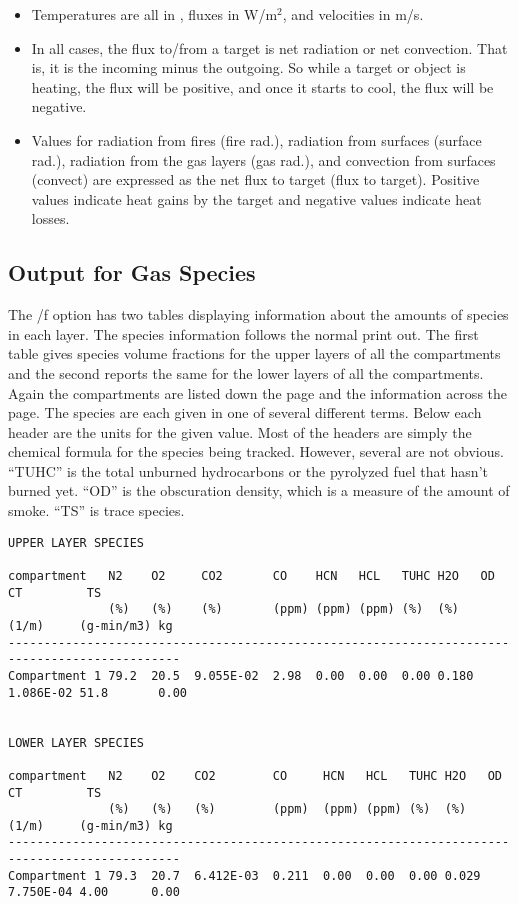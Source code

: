 \begin{itemize}
\item Temperatures are all in \degc, fluxes in W/m$^2$, and velocities in m/s.
\item In all cases, the flux to/from a target is net radiation or net convection. That is, it is the incoming minus the outgoing. So while a target or object is heating, the flux will be positive, and once it starts to cool, the flux will be negative.
\item Values for radiation from fires (fire rad.), radiation from surfaces (surface rad.), radiation from the gas layers (gas rad.), and convection from surfaces (convect) are expressed as the net flux to target (flux to target). Positive values indicate heat gains by the target and negative values indicate heat losses.
\end{itemize}

\subsection{Output for Gas Species}

The /f option has two tables displaying information about the amounts of species in each layer. The species information follows the normal print out.  The first table gives species volume fractions for the upper layers of all the compartments and the second reports the same for the lower layers of all the compartments.  Again the compartments are listed down the page and the information across the page.  The species are each given in one of several different terms.  Below each header are the units for the given value.  Most of the headers are simply the chemical formula for the species being tracked.  However, several are not obvious.  ``TUHC'' is the total unburned hydrocarbons or the pyrolyzed fuel that hasn't burned yet.  ``OD'' is the obscuration density, which is a measure of the amount of smoke. ``TS'' is trace species.

\begin{lstlisting}[basicstyle=\tiny]
UPPER LAYER SPECIES

compartment   N2    O2     CO2       CO    HCN   HCL   TUHC H2O   OD        CT         TS
              (%)   (%)    (%)       (ppm) (ppm) (ppm) (%)  (%)   (1/m)     (g-min/m3) kg
----------------------------------------------------------------------------------------------
Compartment 1 79.2  20.5  9.055E-02  2.98  0.00  0.00  0.00 0.180 1.086E-02 51.8       0.00


LOWER LAYER SPECIES

compartment   N2    O2    CO2        CO     HCN   HCL   TUHC H2O   OD        CT         TS
              (%)   (%)   (%)        (ppm)  (ppm) (ppm) (%)  (%)   (1/m)     (g-min/m3) kg
----------------------------------------------------------------------------------------------
Compartment 1 79.3  20.7  6.412E-03  0.211  0.00  0.00  0.00 0.029 7.750E-04 4.00      0.00
\end{lstlisting}

